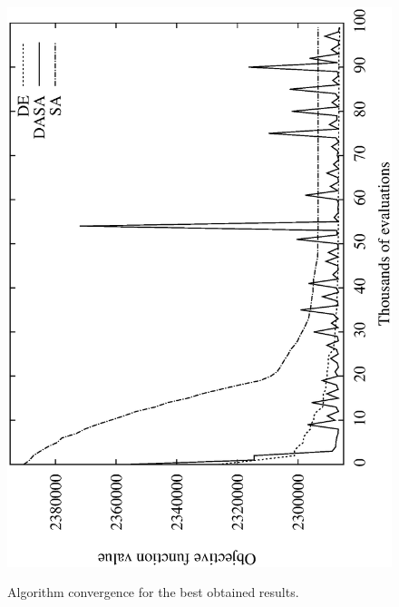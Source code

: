 \begin{figure}
\centering

\includegraphics[width=1\columnwidth]{07-experimental_evaluation/img/convergence}\\\vskip -0.3in

\caption{Algorithm convergence for the best obtained results.\label{fig:algorithm_convergence}}
\end{figure}


